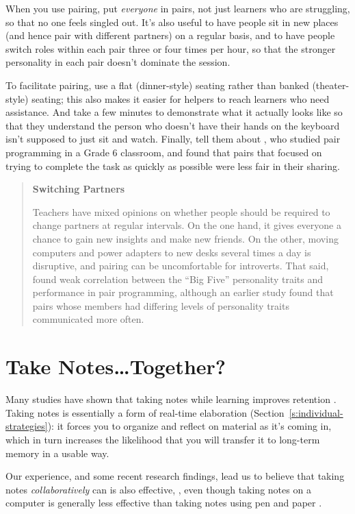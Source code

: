 When you use pairing, put \emph{everyone} in pairs, not just learners who are
struggling, so that no one feels singled out. It's also useful to have
people sit in new places (and hence pair with different partners) on a
regular basis, and to have people switch roles within each pair three or
four times per hour, so that the stronger personality in each pair
doesn't dominate the session.

To facilitate pairing, use a flat (dinner-style) seating rather than
banked (theater-style) seating; this also makes it easier for helpers to
reach learners who need assistance. And take a few minutes to
demonstrate what it actually looks like so that they understand the
person who doesn't have their hands on the keyboard isn't supposed to
just sit and watch. Finally, tell them about \cite{Lewi2015}, who
studied pair programming in a Grade 6 classroom, and found that pairs
that focused on trying to complete the task as quickly as possible were
less fair in their sharing.

\begin{quote}\setlength{\parindent}{0pt}
\textbf{Switching Partners}

Teachers have mixed opinions on whether people should be required to
change partners at regular intervals. On the one hand, it gives
everyone a chance to gain new insights and make new friends. On the
other, moving computers and power adapters to new desks several times
a day is disruptive, and pairing can be uncomfortable for introverts.
That said, \cite{Hann2010} found weak correlation between the ``Big
Five'' personality traits and performance in pair programming, although
an earlier study \cite{Wall2009} found that pairs whose members had
differing levels of personality traits communicated more often.
\end{quote}

\section{Take Notes\ldots{}Together?}\label{s:classroom-notetaking}

Many studies have shown that taking notes while learning improves
retention \cite{Aike1975,Boha2011}. Taking notes is essentially a
form of real-time elaboration (Section~\ref{s:individual-strategies}): it
forces you to organize and reflect on material as it's coming in, which
in turn increases the likelihood that you will transfer it to long-term
memory in a usable way.

Our experience, and some recent research findings, lead us to believe
that taking notes \emph{collaboratively} can is also effective,
\cite{Ornd2015,Yang2015}, even though taking notes on a
computer is generally less effective than taking notes using pen and
paper \cite{Muel2014}.

